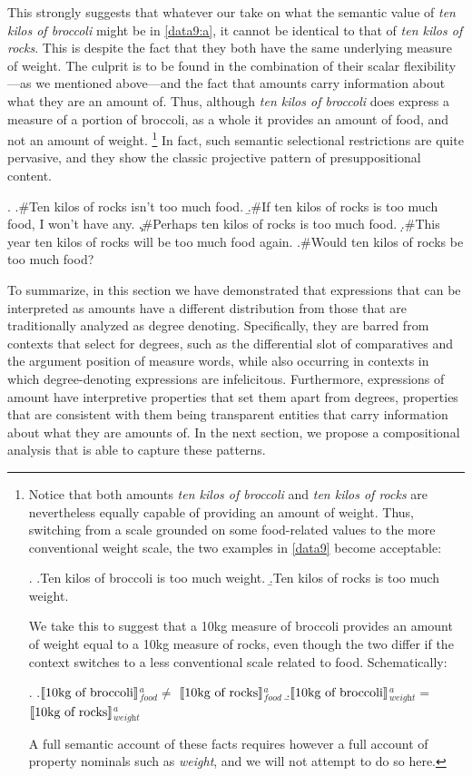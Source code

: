 \documentclass[a4paper,12pt,twoside]{article}
\newcommand{\sv}[1]{\ensuremath{\llbracket\textnormal{#1}\rrbracket}}
\begin{document}
	This strongly suggests that whatever our take on what the semantic value of \textit{ten kilos of broccoli} might be in \ref{data9:a}, it cannot be identical to that of \textit{ten kilos of rocks}. This is despite the fact that they both have the same underlying measure of weight. The culprit is to be found in the combination of their scalar flexibility---as we mentioned above---and the fact that amounts carry information about what they are an amount of. Thus, although \textit{ten kilos of broccoli} does express a measure of a portion of broccoli, as a whole it provides an amount of food, and not an amount of weight.%
		\footnote{%
			Notice that both amounts \textit{ten kilos of broccoli} and \textit{ten kilos of rocks} are nevertheless equally capable of providing an amount of weight. Thus, switching from a scale grounded on some food-related values to the more conventional weight scale, the two examples in \ref{data9} become acceptable:
			
			\ex.
			\a.\label{data9:c}Ten kilos of broccoli is too much weight.
			\b.\label{data9:d}Ten kilos of rocks is too much weight.
			
			We take this to suggest that a 10kg measure of broccoli provides an amount of weight equal to a 10kg measure of rocks, even though the two differ if the context switches to a less conventional scale related to food. Schematically: 
			
			\ex.
			\a.\sv{10kg of broccoli}$^{a}_{\textit{food}} \neq $ \sv{10kg of rocks}$^{a}_{\textit{food}}$
			\b.\sv{10kg of broccoli}$^{a}_{\textit{weight}} =$ \sv{10kg of rocks}$^{a}_{\textit{weight}}$
			
			A full semantic account of these facts requires however a full account of property nominals such as \textit{weight}, and we will not attempt to do so here.
        } 
	In fact, such semantic selectional restrictions are quite pervasive, and they show the classic projective pattern of presuppositional content. 
	
	\ex.
	\a.\#\label{data9:e}Ten kilos of rocks isn't too much food.
	\b.\#\label{data9:f}If ten kilos of rocks is too much food, I won't have any.
	\c.\#\label{data9:g}Perhaps ten kilos of rocks is too much food.
	\d.\#\label{data9:h}This year ten kilos of rocks will be too much food again.
	\e.\#\label{data9:i}Would ten kilos of rocks be too much food?
	
	To summarize, in this section we have demonstrated that expressions that can be interpreted as amounts have a different distribution from those that are traditionally analyzed as degree denoting. Specifically, they are barred from contexts that select for degrees, such as the differential slot of comparatives and the argument position of measure words, while also occurring in contexts in which degree-denoting expressions are infelicitous. Furthermore, expressions of amount have interpretive properties that set them apart from degrees, properties that are consistent with them being transparent entities that carry information about what they are amounts of.  In the next section, we propose a compositional analysis that is able to capture these patterns.
	
\end{document}

